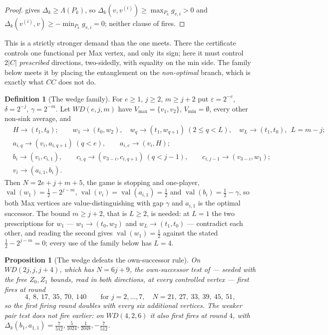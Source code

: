 \documentclass[11pt]{article}
\theoremstyle{plain}
\newtheorem{proposition}[theorem]{Proposition}
\theoremstyle{definition}
\newtheorem{definition}[theorem]{Definition}
\DeclareMathOperator{\val}{val}
\newcommand{\Vmax}{V_{\max}}
\newcommand{\Vmin}{V_{\min}}
\begin{document}
\begin{proof}
 gives $\Delta_k\ge\Lambda(P_k)$, so
$\Delta_k(v,v^{(i)})\ge\max_{P_k}g_{v,i}>0$ and
$\Delta_k(v^{(i)},v)\ge-\min_{P_k}g_{v,i}=0$; neither clause of
 fires.
\end{proof}

This is a strictly stronger demand than the one  meets.
There the certificate controls one functional per Max vertex, and only its sign;
here it must control $2|C|$ \emph{prescribed} directions, two-sidedly, with
equality on the min side. The family below meets it by placing the entanglement
on the \emph{non-optimal} branch, which is exactly what $CC$ does not do.

\begin{definition}[The wedge family]\label{def:wedge}
For $e\ge1$, $j\ge2$, $m\ge j+2$ put $\varepsilon=2^{-e}$, $\delta=2^{-j}$,
$\gamma=2^{-m}$. Let $WD(e,j,m)$ have $\Vmax=\{v_1,v_2\}$, $\Vmin=\emptyset$,
every other non-sink average, and
\[
 \begin{aligned}
  &H\to(t_1,t_0);\qquad
   w_1\to(t_0,w_2),\quad w_q\to(t_1,w_{q+1})\ (2\le q<L),\quad w_L\to(t_1,t_0),
   \ \ L=m-j;\\
  &a_{i,q}\to(v_i,a_{i,q+1})\ (q<e),\qquad a_{i,e}\to(v_i,H);\\
  &b_i\to(v_i,c_{i,1}),\qquad
   c_{i,q}\to(v_{3-i},c_{i,q+1})\ (q<j-1),\qquad c_{i,j-1}\to(v_{3-i},w_1);\\
  &v_i\to(a_{i,1},b_i).
 \end{aligned}
\]
Then $N=2e+j+m+5$, the game is stopping and one-player,
$\val(w_1)=\tfrac12-2^{j-m}$, $\val(v_i)=\val(a_{i,1})=\tfrac12$ and
$\val(b_i)=\tfrac12-\gamma$, so both Max vertices are value-distinguishing with
gap $\gamma$ and $a_{i,1}$ is the optimal successor. The bound $m\ge j+2$,
that is $L\ge2$, is needed: at $L=1$ the two prescriptions for $w_1$ ---
$w_1\to(t_0,w_2)$ and $w_L\to(t_1,t_0)$ --- contradict each other, and reading
the second gives $\val(w_1)=\tfrac12$ against the stated
$\tfrac12-2^{j-m}=0$; every use of the family below has $L=4$.
\end{definition}

\begin{proposition}[The wedge defeats the own-successor rule]\label{prop:wedge}
On $WD(2j,j,j+4)$, which has $N=6j+9$, the own-successor test of
 --- seeded with the free $Z_0,Z_1$ bounds, read in
\emph{both} directions, at \emph{every} controlled vertex --- first fires at
round
\[
  4,\ 8,\ 17,\ 35,\ 70,\ 140 \qquad\text{for } j=2,\dots,7,\quad
  N=21,\ 27,\ 33,\ 39,\ 45,\ 51,
\]
so the first firing round doubles with every six additional vertices. The weaker
pair test does not fire earlier: on $WD(4,2,6)$ it also first fires at round
$4$, with $\Delta_k(b_1,a_{1,1})=\tfrac7{512},\tfrac5{1024},\tfrac1{2048},
-\tfrac7{512}$.
\end{proposition}
\end{document}
